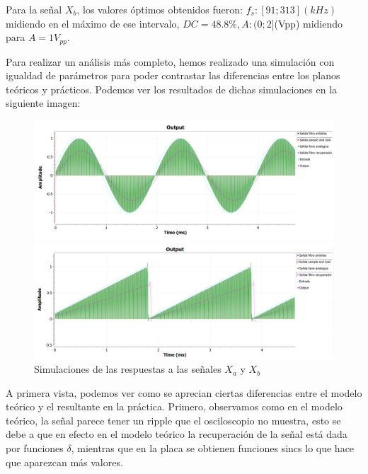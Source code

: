 \documentclass[../../ASSD_TP1_G7.tex]{subfiles}
\begin{document}
Para la señal $X_{b}$, los valores óptimos obtenidos fueron: $f_{s}:[91;313](kHz)$midiendo
en el máximo de ese intervalo, $DC=48.8\%,$$A:(0;2]$(Vpp) midiendo
para $A=1V_{pp}$.

Para realizar un análisis más completo, hemos realizado una simulación
con igualdad de parámetros para poder contrastar las diferencias entre
los planos teóricos y prácticos. Podemos ver los resultados de dichas
simulaciones en la siguiente imagen:

\begin{figure}[H]

\begin{centering}
\includegraphics[scale=0.50]{Imagenes/simulacion_llave_seno_a}
\par\end{centering}
\begin{centering}
\includegraphics[scale=0.5]{Imagenes/simulacion_llave_diente_a}\caption{Simulaciones de las respuestas a las señales $X_{a}$ y $X_{b}$ }
\par\end{centering}
\end{figure}

A primera vista, podemos ver como se aprecian ciertas diferencias
entre el modelo teórico y el resultante en la práctica. Primero, observamos
como en el modelo teórico, la señal parece tener un ripple que el
osciloscopio no muestra, esto se debe a que en efecto en el modelo
teórico la recuperación de la señal está dada por funciones $\delta$,
mientras que en la placa se obtienen funciones sincs lo que hace que
aparezcan más valores.
\end{document}
